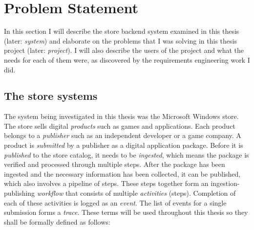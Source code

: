 
\clearpage
\section{Problem Statement}
\label{sec:problem}

In this section I will describe the store backend system examined in this thesis (later: \textit{system}) 
and elaborate on the problems that I was solving in this thesis project (later: \textit{project}). 
I will also describe the users of the project and what the needs for
each of them were, as discovered by the requirements engineering work I did.


\subsection{The store systems}

The system being investigated in this thesis was the Microsoft Windows store.
The store sells digital \emph{products} such as games and applications.
Each product belongs to a \emph{publisher} such as an independent developer or a game company.
A product is \emph{submitted} by a publisher as a digital application package.
Before it is \emph{published} to the store catalog, it needs to be \emph{ingested},
which means the package is verified and processed through multiple steps.
After the package has been ingested and the necessary information has been collected,
it can be published, which also involves a pipeline of steps.
These steps together form an ingestion-publishing \emph{workflow} that consists of multiple \emph{activities} (steps).
Completion of each of these activities is logged as an \emph{event}.
The list of events for a single submission forms a \emph{trace}.
These terms will be used throughout this thesis so they shall be formally defined as follows:


